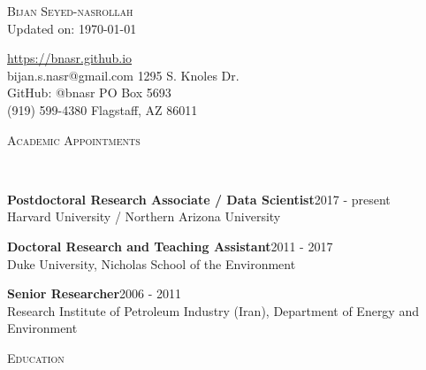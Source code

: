 \documentclass[10pt]{article}
\makeatletter
\newenvironment{changemargin}[2]{%
  \begin{list}{}{%
 \setlength{\topsep}{0pt}%
 \setlength{\leftmargin}{#1}%
 \setlength{\rightmargin}{#2}%
 \setlength{\listparindent}{\parindent}%
 \setlength{\itemindent}{\parindent}%
 \setlength{\parsep}{\parskip}%
  }%
  \item[]}{\end{list}
}
\newcommand{\lineover}{
  \begin{changemargin}{-0.05in}{-0.05in}
  \vspace*{-8pt}
  \hrulefill \\
  \vspace*{-2pt}
  \end{changemargin}
}
\newcommand{\header}[1]{
  \begin{changemargin}{-0.5in}{-0.5in}
  \scshape{#1}\\
  \lineover
  \end{changemargin}
}
\newcommand{\contact}[9]{
  \begin{changemargin}{-0.5in}{-0.5in}
  \begin{flushleft}
  
  {\huge \scshape {#1}}\\ 
  
  \bigskip
  {Updated on: #2}\medskip
  
  \url{#3} \\
  {#4} \hfill{#5}\\
  GitHub: @{#6} \hfill{#7}\\
  {#8} \hfill{#9}\\
  
  \end{flushleft}
  \medskip
  \end{changemargin}
}
\newenvironment{body} {
  \vspace*{-2pt}
  \begin{changemargin}{-0.5in}{-0.5in}
}
{\end{changemargin}
}
\makeatother
\begin{document}
\contact{Bijan Seyed-nasrollah}{\today}
{https://bnasr.github.io}
{bijan.s.nasr@gmail.com}{1295 S. Knoles Dr.}
{bnasr}{PO Box 5693}
{(919) 599-4380}{Flagstaff, AZ 86011}



\medskip
\medskip

\newcommand{\thedate}{\today}
\header{Academic Appointments}

\begin{body}

  \textbf{Postdoctoral Research Associate / Data Scientist}\hfill {2017 - present}\\
  {Harvard University / Northern Arizona University}\\
  
  \medskip

  \textbf{Doctoral Research and Teaching Assistant}\hfill {2011 - 2017}\\
  {Duke University}, Nicholas School of the Environment 
  \medskip

  \textbf{Senior Researcher}\hfill {2006 - 2011}\\
  {Research Institute of Petroleum Industry (Iran)}, Department of Energy and Environment 
  \medskip

\end{body}
\medskip

\header{Education}
\end{document}
